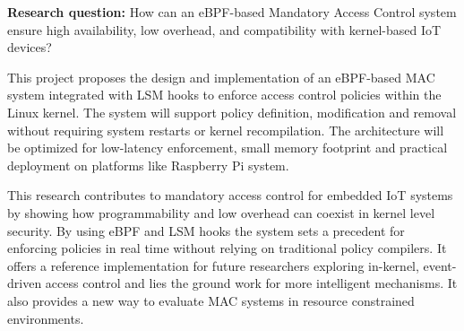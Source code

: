 \textbf{Research question: } How can an eBPF-based Mandatory Access Control system ensure high availability, low overhead, and compatibility with kernel-based IoT devices?


This project proposes the design and implementation of an eBPF-based MAC system integrated with LSM hooks to enforce access control policies within the Linux kernel. The system will support policy definition, modification and removal without requiring system restarts or kernel recompilation. The architecture will be optimized for low-latency enforcement, small memory footprint and practical deployment on platforms like Raspberry Pi system. 

This research contributes to mandatory access control for embedded IoT systems by showing how programmability and low overhead can coexist in kernel level security. By using eBPF and LSM hooks the system sets a precedent for enforcing policies in real time without relying on traditional policy compilers. It offers a reference implementation for future researchers exploring in-kernel, event-driven access control and lies the ground work for more intelligent mechanisms. It also provides a new way to evaluate MAC systems in resource constrained environments.



